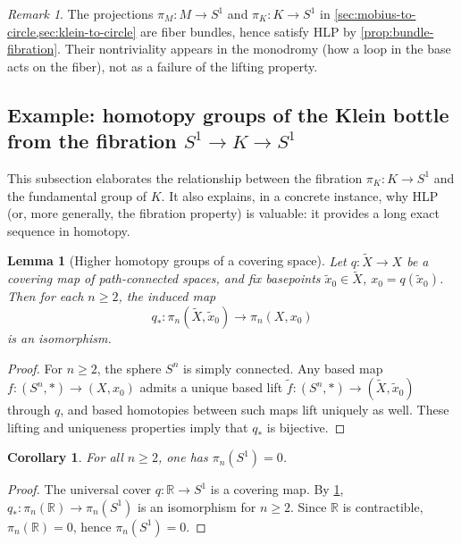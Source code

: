 \documentclass[11pt,a4paper]{article}
\newtheorem{lemma}[theorem]{Lemma}
\newtheorem{corollary}[theorem]{Corollary}
\theoremstyle{definition}
\theoremstyle{remark}
\newtheorem{remark}[theorem]{Remark}
\begin{document}
\begin{remark}
\label{rem:mobius-klein-hlp}
The projections \(\pi_M:M\to S^1\) and \(\pi_K:K\to S^1\) in \cref{sec:mobius-to-circle,sec:klein-to-circle} are fiber bundles, hence satisfy HLP by \cref{prop:bundle-fibration}. Their nontriviality appears in the monodromy (how a loop in the base acts on the fiber), not as a failure of the lifting property.
\end{remark}

\subsection{Example: homotopy groups of the Klein bottle from the fibration \(S^1\to K\to S^1\)}
\label{sec:klein-les}

This subsection elaborates the relationship between the fibration \(\pi_K:K\to S^1\) and the fundamental group of \(K\). It also explains, in a concrete instance, why HLP (or, more generally, the fibration property) is valuable: it provides a long exact sequence in homotopy.

\begin{lemma}[Higher homotopy groups of a covering space]
\label{lem:covering-higher-pi}
Let \(q:\widetilde X\to X\) be a covering map of path-connected spaces, and fix basepoints \(\tilde x_0\in \widetilde X\), \(x_0=q(\tilde x_0)\). Then for each \(n\ge 2\), the induced map
\[
q_*:\pi_n(\widetilde X,\tilde x_0)\to \pi_n(X,x_0)
\]
is an isomorphism.
\end{lemma}

\begin{proof}
For \(n\ge 2\), the sphere \(S^n\) is simply connected. Any based map \(f:(S^n,*)\to (X,x_0)\) admits a unique based lift \(\tilde f:(S^n,*)\to (\widetilde X,\tilde x_0)\) through \(q\), and based homotopies between such maps lift uniquely as well. These lifting and uniqueness properties imply that \(q_*\) is bijective.
\end{proof}

\begin{corollary}
\label{cor:pi-n-s1}
For all \(n\ge 2\), one has \(\pi_n(S^1)=0\).
\end{corollary}

\begin{proof}
The universal cover \(q:\mathbb{R}\to S^1\) is a covering map. By \cref{lem:covering-higher-pi}, \(q_*:\pi_n(\mathbb{R})\to \pi_n(S^1)\) is an isomorphism for \(n\ge 2\). Since \(\mathbb{R}\) is contractible, \(\pi_n(\mathbb{R})=0\), hence \(\pi_n(S^1)=0\).
\end{proof}
\end{document}
